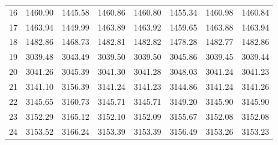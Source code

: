\documentclass[10pt,oneside]{article}
\begin{document}
\begin{table}[h!]
\begin{tabular}{cccccccc}
16 &   1460.90 & 1445.58 & 1460.86 & 1460.80 &      1455.34 & 1460.98 & 1460.84 \\
17 &   1463.94 & 1449.99 & 1463.89 & 1463.92 &      1459.65 & 1463.88 & 1463.94 \\
18 &   1482.86 & 1468.73 & 1482.81 & 1482.82 &      1478.28 & 1482.77 & 1482.86 \\
19 &   3039.48 & 3043.49 & 3039.50 & 3039.50 &      3045.86 & 3039.45 & 3039.44 \\
20 &   3041.26 & 3045.39 & 3041.30 & 3041.28 &      3048.03 & 3041.24 & 3041.23 \\
21 &   3141.10 & 3156.39 & 3141.24 & 3141.23 &      3144.86 & 3141.24 & 3141.26 \\
22 &   3145.65 & 3160.73 & 3145.71 & 3145.71 &      3149.20 & 3145.90 & 3145.90 \\
23 &   3152.29 & 3165.12 & 3152.10 & 3152.09 &      3155.67 & 3152.08 & 3152.08 \\
24 &   3153.52 & 3166.24 & 3153.39 & 3153.39 &      3156.49 & 3153.26 & 3153.23 \\
\bottomrule
\end{tabular}
\end{table}

\clearpage
\end{document}
